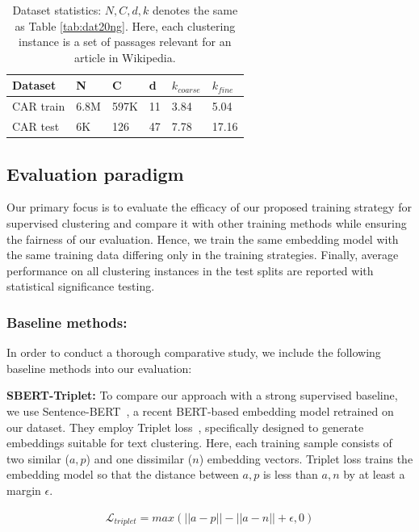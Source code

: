 \documentclass[11pt,a4paper]{article}
\begin{document}
\begin{table}[h]
\caption{Dataset statistics: $N,C,d,k$ denotes the same as Table \ref{tab:dat20ng}. Here, each clustering instance is a set of passages relevant for an article in Wikipedia.}
\begin{tabular}{llllll}
\hline
Dataset & N & C & d & $k_{coarse}$ & $k_{fine}$ \\ \hline
CAR train  & 6.8M & 597K & 11 & 3.84 & 5.04 \\
CAR test   & 6K & 126 & 47 & 7.78 & 17.16   
\end{tabular}
\label{tab:dat}
\end{table}

\subsection{Evaluation paradigm} Our primary focus is to evaluate the efficacy of our proposed training strategy for supervised clustering and compare it with other training methods while ensuring the fairness of our evaluation. Hence, we train the same embedding model with the same training data differing only in the training strategies. Finally, average performance on all clustering instances in the test splits are reported with statistical significance testing. 

\subsubsection{Baseline methods:} In order to conduct a thorough comparative study, we include the following baseline methods into our evaluation:

\textbf{SBERT-Triplet:} To compare our approach with a strong supervised baseline, we use Sentence-BERT~\cite{reimers2019sentence}, a recent BERT-based embedding model retrained on our dataset. They employ Triplet loss~\cite{dor2018learning}, specifically designed to generate embeddings suitable for text clustering. Here, each training sample consists of two similar ($a,p$) and one dissimilar ($n$) embedding vectors. Triplet loss trains the embedding model so that the distance between $a,p$ is less than $a,n$ by at least a margin $\epsilon$.

\begin{align*}
    \mathcal{L}_{triplet} = max(||a-p||-||a-n||+\epsilon, 0)
\end{align*}

\end{document}
